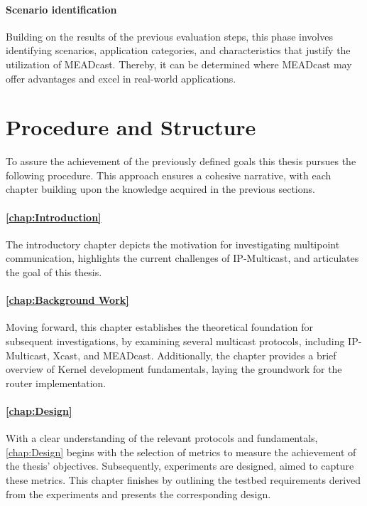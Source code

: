 \paragraph{Scenario identification} %
\label{par:Scenario identification}
Building on the results of the previous evaluation steps, this phase involves
    identifying scenarios, application categories, and characteristics that
    justify the utilization of MEADcast.
Thereby, it can be determined where MEADcast may offer advantages and excel in
    real-world applications.
    
    



\section{Procedure and Structure} %
\label{sec:Structure}
To assure the achievement of the previously defined goals this thesis pursues
    the following procedure.
This approach ensures a cohesive narrative, with each chapter building upon the
    knowledge acquired in the previous sections.

\paragraph{\autoref{chap:Introduction}} %
\label{par:Intro_Structure_Introduction}
The introductory chapter depicts the motivation for investigating multipoint
    communication, highlights the current challenges of IP-Multicast, and
    articulates the goal of this thesis.

\paragraph{\autoref{chap:Background Work}} %
\label{par:Intro_Structure_Background Work}
Moving forward, this chapter establishes the theoretical foundation for
    subsequent investigations, by examining several multicast protocols,
    including IP-Multicast, Xcast, and MEADcast.
Additionally, the chapter provides a brief overview of Kernel development
    fundamentals, laying the groundwork for the router implementation.

\paragraph{\autoref{chap:Design}} %
\label{par:Intro_Structure_Design}
With a clear understanding of the relevant protocols and fundamentals,
    \autoref{chap:Design} begins with the selection of metrics to measure the
    achievement of the thesis' objectives.
Subsequently, experiments are designed, aimed to capture these metrics.
This chapter finishes by outlining the testbed requirements derived from the 
    experiments and presents the corresponding design.

